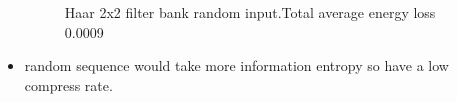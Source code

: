 \documentclass{beamer}
\begin{document}
\begin{frame}
\begin{itemize}
\begin{figure}[ht!]
\begin{minipage}{0.45\textwidth}
                      \caption{Haar 2x2 filter bank random input.Total average energy loss 0.0009}
                  \end{minipage}
              \end{figure}
        \item random sequence would take more information entropy so have a low compress rate.
    \end{itemize}
\end{frame}
\end{document}
